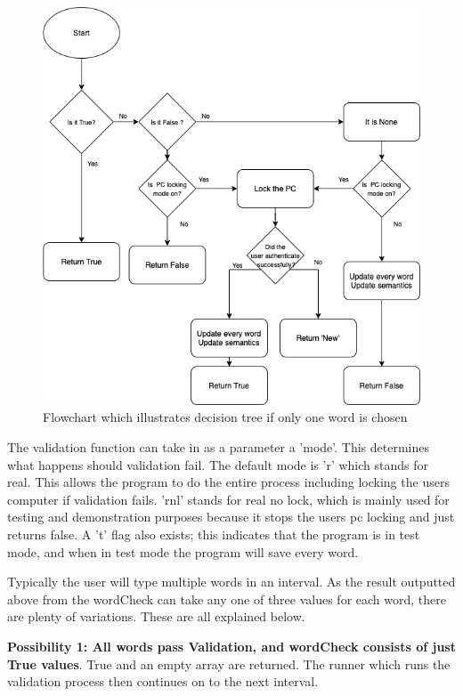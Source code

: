 \documentclass[10pt,a4paper]{report}
\begin{document}
\begin{figure}[h]
	\centering
	\includegraphics[scale=0.4]{IfLen1}
	\caption{Flowchart which illustrates decision tree if only one word is chosen}
	\label{fig:If1}
\end{figure}

The validation function can take in as a parameter a 'mode'. This determines what happens should validation fail. The default mode is 'r' which stands for real. This allows the program to do the entire process including locking the users computer if validation fails. 'rnl' stands for real no lock, which is mainly used for testing and demonstration purposes because it stops the users pc locking and just returns false. A 't' flag also exists; this indicates that the program is in test mode, and when in test mode the program will save every word.

Typically the user will type multiple words in an interval. As the result outputted above from the wordCheck can take any one of three values for each word, there are plenty of variations. These are all explained below.

\textbf{Possibility 1: All words pass Validation, and wordCheck consists of just True values}. True and an empty array are returned. The runner which runs the validation process then continues on to the next interval.
\end{document}

